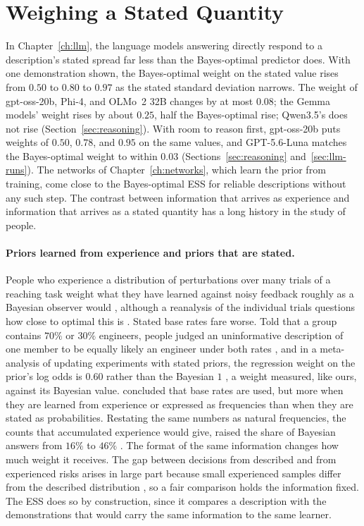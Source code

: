 \section{Weighing a Stated Quantity}\label{sec:hl-deliberate}
In Chapter~\ref{ch:llm}, the language models answering directly respond to a description's stated spread far less than the Bayes-optimal predictor does. With one demonstration shown, the Bayes-optimal weight on the stated value rises from $0.50$ to $0.80$ to $0.97$ as the stated standard deviation narrows. The weight of gpt-oss-20b, Phi-4, and OLMo~2 32B changes by at most $0.08$; the Gemma models' weight rises by about $0.25$, half the Bayes-optimal rise; Qwen3.5's does not rise (Section~\ref{sec:reasoning}). With room to reason first, gpt-oss-20b puts weights of $0.50$, $0.78$, and $0.95$ on the same values, and GPT-5.6-Luna matches the Bayes-optimal weight to within $0.03$ (Sections~\ref{sec:reasoning} and~\ref{sec:llm-runs}). The networks of Chapter~\ref{ch:networks}, which learn the prior from training, come close to the Bayes-optimal ESS for reliable descriptions without any such step. The contrast between information that arrives as experience and information that arrives as a stated quantity has a long history in the study of people.

\paragraph{Priors learned from experience and priors that are stated.} People who experience a distribution of perturbations over many trials of a reaching task weight what they have learned against noisy feedback roughly as a Bayesian observer would \citep{kording2004}, although a reanalysis of the individual trials questions how close to optimal this is \citep{duffy2022}. Stated base rates fare worse. Told that a group contains $70\%$ or $30\%$ engineers, people judged an uninformative description of one member to be equally likely an engineer under both rates \citep{kahneman1973}, and in a meta-analysis of updating experiments with stated priors, the regression weight on the prior's log odds is $0.60$ rather than the Bayesian $1$ \citep{benjamin2019}, a weight measured, like ours, against its Bayesian value. \citet{koehler1996} concluded that base rates are used, but more when they are learned from experience or expressed as frequencies than when they are stated as probabilities. Restating the same numbers as natural frequencies, the counts that accumulated experience would give, raised the share of Bayesian answers from $16\%$ to $46\%$ \citep{gigerenzer1995}. The format of the same information changes how much weight it receives. The gap between decisions from described and from experienced risks \citep{hertwig2004} arises in large part because small experienced samples differ from the described distribution \citep{fox2006}, so a fair comparison holds the information fixed. The ESS does so by construction, since it compares a description with the demonstrations that would carry the same information to the same learner.

